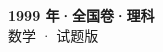\documentclass[zihao=-4, a4paper]{ctexart}
\begin{document}
\begin{center}
  {\Large\bfseries 1999 年·全国卷·理科}\\[4pt]
  {\large 数学 · 试题版}
\end{center}
\medskip
{}

\end{document}

